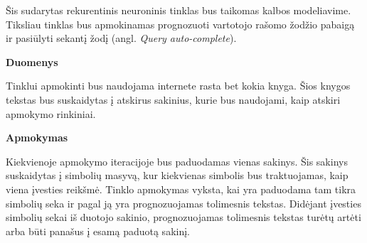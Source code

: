 Šis sudarytas rekurentinis neuroninis tinklas bus taikomas kalbos modeliavime. Tiksliau tinklas bus apmokinamas prognozuoti vartotojo rašomo žodžio pabaigą ir pasiūlyti sekantį žodį (angl. \textit{Query auto-complete}).

\textbf{Duomenys}

Tinklui apmokinti bus naudojama internete rasta bet kokia knyga. Šios knygos tekstas bus suskaidytas į atskirus sakinius, kurie bus naudojami, kaip atskiri apmokymo rinkiniai.

\textbf{Apmokymas}

Kiekvienoje apmokymo iteracijoje bus paduodamas vienas sakinys. Šis sakinys suskaidytas į simbolių masyvą, kur kiekvienas simbolis bus traktuojamas, kaip viena įvesties reikšmė. Tinklo apmokymas vyksta, kai yra paduodama tam tikra simbolių seka ir pagal ją yra prognozuojamas tolimesnis tekstas. Didėjant įvesties simbolių sekai iš duotojo sakinio, prognozuojamas tolimesnis tekstas turėtų artėti arba būti panašus į esamą paduotą sakinį.

